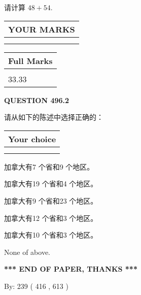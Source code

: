 \documentclass{ctexart}
\begin{document}
  
 
请计算 $ %
48 +  %
54 $.
 

 

 
  
\vspace{0.2in}
  
\noindent\begin{tabular}{|l|}
\hline
 YOUR MARKS  \\
\hline
 \\ 
 \\ 
\hline
\end{tabular}
\hspace{0.05in} \begin{tabular}{|l|}
\hline
 Full Marks  \\
\hline
 \\ 
33.33 \\
\hline
\end{tabular}
{\textbf{\Large{QUESTION
496.2 
}}}
  
  
请从如下的陈述中选择正确的：
  
  
\noindent\hspace{3.0in} \begin{tabular}{|l|}
\hline
Your choice \\
\hline
 \\ 
 \\ 
\hline
\end{tabular}
  
  
 
 
加拿大有7 个省和9 个地区。
 
 
加拿大有19 个省和4 个地区。
 
 
加拿大有9 个省和23 个地区。
 
 
加拿大有12 个省和3 个地区。
 
 
加拿大有10 个省和3 个地区。
 
 
 None of above.
 
 
   
   
 \vspace{0.2in}
 
   
   
   
   
\vspace{1.0in} 
{\textbf{\large{ *** END OF PAPER, THANKS *** }}} 
   
   
\hspace{1.0in} By: 
 239 ( 416 ,  613 )
   
\end{document}
